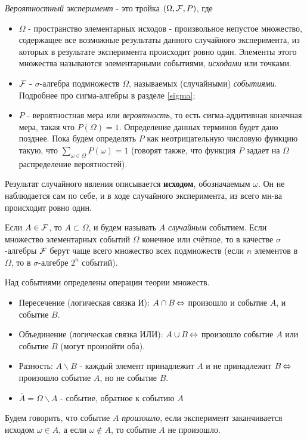 \begin{definition}
	\textit{Вероятностный эксперимент} - это тройка $(\Omega, {\mathcal F}, P)$, где
	\begin{itemize}
		\item $\Omega$ - пространство элементарных исходов - произвольное непустое множество, содержащее все возможные результаты данного случайного эксперимента, из которых в результате эксперимента происходит ровно один. Элементы этого множества называются элементарными событиями, \textit{исходами} или точками.
		\item ${\mathcal F}$ - $\sigma$-алгебра подмножеств $\Omega$, называемых (случайными) \textit{событиями}. Подробнее про сигма-алгебры в разделе \ref{sigma};
		\item $P$ - вероятностная мера или \textit{вероятность}, то есть сигма-аддитивная конечная мера, такая что $P(\Omega) = 1$. Определение данных терминов будет дано позднее. Пока будем определять $P$ как неотрицательную числовую функцию такую, что $\sum\limits_{\omega \in \Omega} P(\omega) = 1$ (говорят также, что функция $P$ задает на $\Omega$ распределение вероятностей).
	\end{itemize}
\end{definition}

\begin{remark}
	Результат случайного явления описывается \textbf{исходом}, обозначаемым $\omega$. Он не наблюдается сам по себе, и в ходе случайного эксперимента, из всего мн-ва происходит ровно один.
\end{remark}

\begin{definition}
	Если $A \in {\mathcal F}$, то $A \subset \Omega$, и будем называть $A$ \textit{случайным} событием. Если множество элементарных событий $\Omega$ конечное или счётное, то в качестве $\sigma$-алгебры ${\mathcal F}$ берут чаще всего множество всех подмножеств (если $n$ элементов в $\Omega$, то в $\sigma$-алгебре $2^n$ событий).
	
	Над событиями определены операции теории множеств.
	
	\begin{itemize}
		\item Пересечение (логическая связка И): $A \cap B \operatorname{\Leftrightarrow}$ произошло и событие $A$, и событие $B$.
		\item Объединение (логическая связка ИЛИ): $A \cup B \operatorname{\Leftrightarrow}$ произошло событие $A$ или событие $B$ (могут произойти оба).
		\item Разность: $A \backslash B$ - каждый элемент принадлежит $A$ и не принадлежит $B \operatorname{\Leftrightarrow}$ произошло событие $A$, но не событие $B$.
		\item $\bar A = \Omega \backslash A$ - событие, обратное к событию $A$
	\end{itemize}

	Будем говорить, что событие $A$ \textit{произошло}, если эксперимент заканчивается исходом $\omega \in A$, а если $\omega \notin A$, то событие $A$ не произошло.
\end{definition}

